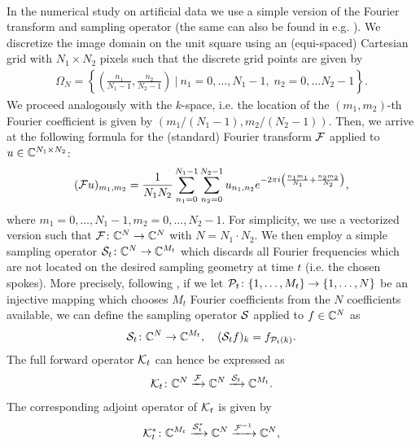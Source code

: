 \\
\noindent
In the numerical study on artificial data we use a simple version of the Fourier transform and sampling operator (the same can also be found in e.g. \cite{Ehrhardt2016,Rasch2017}). 
We discretize the image domain on the unit square using an (equi-spaced) Cartesian grid with $N_1 \times N_2$ pixels such that the discrete grid points are given by 
\begin{align*}
 \Omega_N = \left\{ \left(\frac{n_1}{N_1-1}, \frac{n_2}{N_2-1} \right) ~\Big|~ n_1 = 0, \dots, N_1-1, \; n_2 = 0, \dots N_2-1 \right\}.
\end{align*}
We proceed analogously with the $k$-space, i.e. the location of the $(m_1,m_2)$-th Fourier coefficient is given by $(m_1/(N_1-1), m_2/(N_2-1))$. Then, we arrive at the following formula for the (standard) Fourier transform $\mathcal{F}$ applied to $u \in \mathbb{C}^{N_1 \times N_2}$:
\begin{align*}
 (\mathcal{F} u)_{m_1,m_2} = \frac{1}{N_1 N_2} \sum_{n_1=0}^{N_1-1} \sum_{n_2=0}^{N_2-1} u_{n_1,n_2} e^{-2\pi i \left(\frac{n_1 m_1}{N_1} + \frac{n_2 m_2}{N_2} \right)},
\end{align*}
where $ m_1 = 0, \dots, N_1-1, m_2 = 0, \dots, N_2 -1$.
For simplicity, we use a vectorized version such that $\mathcal{F} \colon \mathbb{C}^N \to \mathbb{C}^N$ with $N = N_1 \cdot N_2$.
We then employ a simple sampling operator $\mathcal{S}_t \colon \mathbb{C}^N \to \mathbb{C}^{M_t}$ which discards all Fourier frequencies which are not located on the desired sampling geometry at time $t$ (i.e. the chosen spokes). 
More precisely, following \cite{Ehrhardt2016}, if we let $\mathcal{P}_t \colon \{1,\dots,M_t \} \to \{1,\dots,N\}$ be an injective mapping which chooses $M_t$ Fourier coefficients from the $N$ coefficients available, we can define the sampling operator $\mathcal{S}$ applied to $f \in \mathbb{C}^N$ as
\begin{align*}
 \mathcal{S}_t \colon \mathbb{C}^N \to \mathbb{C}^{M_t}, \quad (\mathcal{S}_t f)_k = f_{\mathcal{P}_t(k)}.
\end{align*}
The full forward operator $\mathcal{K}_t$ can hence be expressed as 
\begin{align}\label{eq:forward_op_art}
 \mathcal{K}_t \colon \mathbb{C}^N \xrightarrow{\mathcal{F}} \mathbb{C}^N \xrightarrow{\mathcal{S}_t} \mathbb{C}^{M_t}.
\end{align}
The corresponding adjoint operator of $\mathcal{K}_t$ is given by  
\begin{align*}
 \mathcal{K}_t^* \colon \mathbb{C}^{M_t} \xrightarrow{\mathcal{S}_t^*} \mathbb{C}^N \xrightarrow{\mathcal{F}^{-1}} \mathbb{C}^N,
\end{align*}
